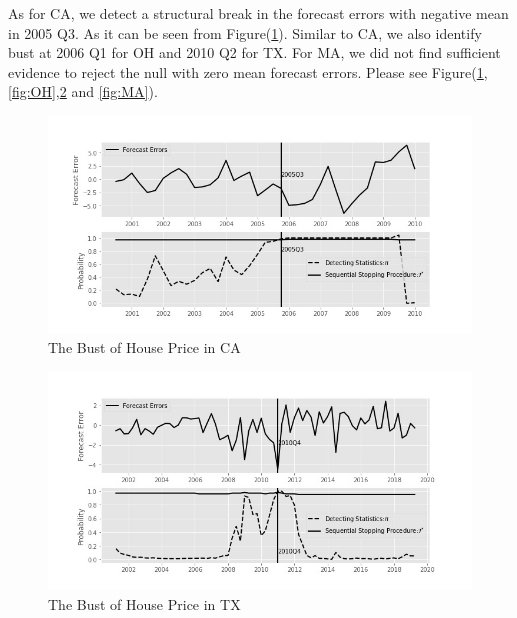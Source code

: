\documentclass[preprint,authoryear,12pt,english]{elsarticle}
\theoremstyle{plain}
\begin{document}
As for CA, we detect a structural break in the forecast errors with negative mean in 2005 Q3. As it can be seen from Figure(\ref{fig:CA_bust}). Similar to CA, we also identify bust at 2006 Q1 for OH and 2010 Q2 for TX. For MA, we did not find sufficient evidence to reject the null with zero mean forecast errors. Please see Figure(\ref{fig:CA_bust},\ref{fig:OH},\ref{fig:TX} and \ref{fig:MA}).
\noindent \begin{center}
    \begin{figure}[H]
        \centering
        \includegraphics[scale=0.5]{"graph/Bsquid_CA_bust"}
        \protect\caption{\label{fig:CA_bust}The Bust of House Price in CA}
    \end{figure}
    \par\end{center}
\noindent \begin{center}
    \begin{figure}[H]
        \centering
        \includegraphics[scale=0.5]{"graph/Bsquid_TX"}
        \protect\caption{\label{fig:TX}The Bust of House Price in TX}
    \end{figure}
    \par\end{center}
\end{document}
